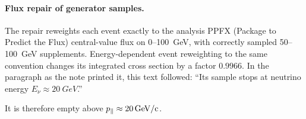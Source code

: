 \paragraph{Flux repair of generator samples.} The repair reweights each event exactly to the analysis PPFX (Package to Predict the Flux) central-value flux on 0--\SI{100}{GeV}, with correctly sampled 50--\SI{100}{GeV} supplements. Energy-dependent event reweighting to the same convention changes its integrated cross section by a factor $0.9966$. In the paragraph as the note printed it, this text followed: ``Its sample stops at neutrino energy $E_\nu\approx\SI{20}{GeV}$.''\par It is therefore empty above $p_{\parallel}\approx\SI{20}{GeV/c}$.

